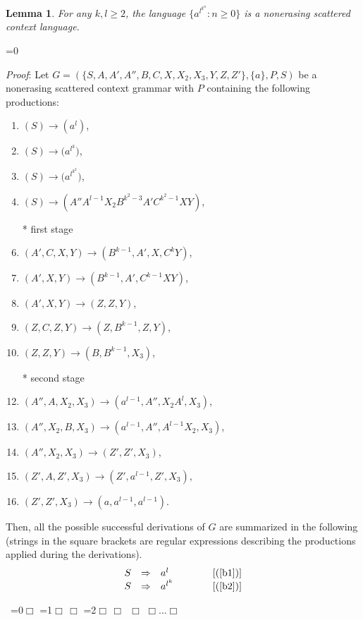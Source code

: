 \documentclass[copyright]{eptcs}
\makeatletter
\newtheorem{lemma}[theorem]{Lemma}
\newcounter{d@proof}\let\thed@proof\relax\setcounter{d@proof}{0}
\newcommand*{\qed}{$\Box$}
\newenvironment{proof}{\ifnum \value{d@proof}=0{\setcounter{claim}{0}}\else\fi
  \stepcounter{d@proof}\par\noindent
  {\rmfamily\itshape\mdseries Proof\/}:\hspace{\labelsep}\ignorespaces}{\addtocounter{d@proof}{-1}\mbox{}\nolinebreak\hfill~\ifnum \value{d@proof}=0{\qed}\else
    \ifnum \value{d@proof}=1{\qed\nolinebreak\,\nolinebreak\qed}\else
      \ifnum \value{d@proof}=2{\qed\nolinebreak\,\nolinebreak\qed
          \nolinebreak\,\nolinebreak\qed}\else
        {\qed\nolinebreak...\nolinebreak\qed}\fi\fi\fi
  \medbreak
}
\newcommand{\Ra}{\Rightarrow}
\makeatother
\begin{document}
  \begin{lemma}\label{lem1}
    For any $k,l\ge 2$, the language $\{a^{l^{k^n}} : n\ge 0\}$ is a nonerasing scattered context language.
  \end{lemma}
  \begin{proof}
    Let $G=(\{S,A,A',A'',B,C,X,X_2,X_3,Y,Z,Z'\},\{a\},P,S)$ be a nonerasing scattered context grammar with $P$ containing the following productions:
    \begin{enumerate}
      \item\label{b1} $(S) \to (a^l)$,
      \item\label{b2} $(S) \to \big(a^{l^k}\big)$,
      \item\label{b3} $(S) \to \Big(a^{l^{k^2}}\Big)$,
      \item\label{b4} $(S) \to (A''A^{l-1}X_2B^{k^2-3}A'C^{k^2-1}XY)$,
\item[*] first stage
      \item\label{b5} $(A',C,X,Y) \to (B^{k-1},A',X,C^{k}Y)$,
      \item\label{b6} $(A',X,Y) \to (B^{k-1},A',C^{k-1}XY)$,
      \item\label{b7} $(A',X,Y) \to (Z,Z,Y)$,
      \item\label{b8} $(Z,C,Z,Y) \to (Z,B^{k-1},Z,Y)$,
      \item\label{b9} $(Z,Z,Y) \to (B,B^{k-1},X_3)$,
\item[*] second stage
      \item\label{b10} $(A'',A,X_2,X_3) \to (a^{l-1},A'',X_2A^{l},X_3)$,
      \item\label{b11} $(A'',X_2,B,X_3) \to (a^{l-1},A'',A^{l-1}X_2,X_3)$,
      \item\label{b12} $(A'',X_2,X_3) \to (Z',Z',X_3)$,
      \item\label{b13} $(Z',A,Z',X_3) \to (Z',a^{l-1},Z',X_3)$,
      \item\label{b14} $(Z',Z',X_3) \to (a,a^{l-1},a^{l-1})$.
    \end{enumerate}
    Then, all the possible successful derivations of $G$ are summarized in the following (strings in the square brackets are regular expressions describing the productions applied during the derivations).
    \[\begin{array}{rllcl}
      S & \Ra   & a^l                                     & \qquad & [\textrm{(\ref{b1})}]\\
      S & \Ra   & a^{l^k}                                 & \qquad & [\textrm{(\ref{b2})}]\\

\end{array}\]
\end{proof}
\end{document}
